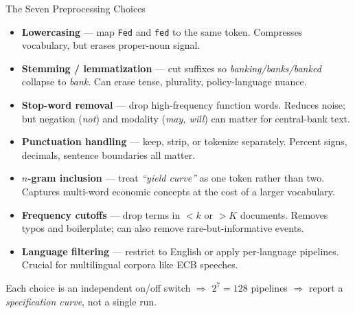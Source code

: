 \begin{frame}{The Seven Preprocessing Choices}
\small
\begin{itemize}
\item \textbf{Lowercasing} --- map \texttt{Fed} and \texttt{fed} to the same token. Compresses vocabulary, but erases proper-noun signal.
\item \textbf{Stemming / lemmatization} --- cut suffixes so \emph{banking/banks/banked} collapse to \emph{bank}. Can erase tense, plurality, policy-language nuance.
\item \textbf{Stop-word removal} --- drop high-frequency function words. Reduces noise; but negation (\emph{not}) and modality (\emph{may, will}) can matter for central-bank text.
\item \textbf{Punctuation handling} --- keep, strip, or tokenize separately. Percent signs, decimals, sentence boundaries all matter.
\item \textbf{$n$-gram inclusion} --- treat \emph{``yield curve''} as one token rather than two. Captures multi-word economic concepts at the cost of a larger vocabulary.
\item \textbf{Frequency cutoffs} --- drop terms in $<k$ or $>K$ documents. Removes typos and boilerplate; can also remove rare-but-informative events.
\item \textbf{Language filtering} --- restrict to English or apply per-language pipelines. Crucial for multilingual corpora like ECB speeches.
\end{itemize}

\smallskip
Each choice is an independent on/off switch $\Rightarrow$ $2^{7} = 128$ pipelines $\Rightarrow$ report a \emph{specification curve}, not a single run.
\end{frame}


